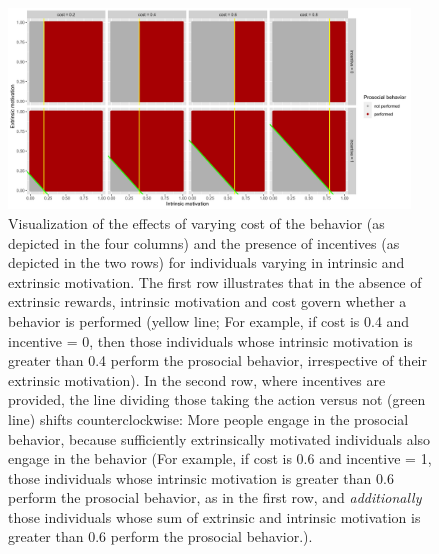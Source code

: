\documentclass[AER]{AEA}
\begin{document}
\begin{figure}[t!]
    \centering
    \includegraphics[width=0.95\textwidth]{images/direct_benefit.png}
    \caption{Visualization of the effects of varying cost of the behavior (as depicted in the four columns) and the presence of incentives (as depicted in the two rows) for individuals varying in intrinsic and extrinsic motivation. The first row illustrates that in the absence of extrinsic rewards, intrinsic motivation and cost govern whether a behavior is performed (yellow line; For example, if cost is 0.4 and incentive = 0, then those individuals whose intrinsic motivation is greater than 0.4 perform the prosocial behavior, irrespective of their extrinsic motivation). In the second row, where incentives are provided, the line dividing those taking the action versus not (green line) shifts counterclockwise: More people engage in the prosocial behavior, because sufficiently extrinsically motivated individuals also engage in the behavior (For example, if cost is 0.6 and incentive = 1, those individuals whose intrinsic motivation is greater than 0.6 perform the prosocial behavior, as in the first row, and \textit{additionally} those individuals whose sum of extrinsic and intrinsic motivation is greater than 0.6 perform the prosocial behavior.).}
    \label{fig:model_IM_EM}
\end{figure}
\end{document}
